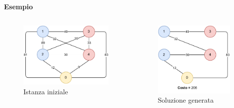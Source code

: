 \documentclass[9pt]{beamer}
\begin{document}
\begin{frame}[allowframebreaks]{\subsecname}
\textbf{Esempio}
\begin{columns}[T,onlytextwidth]
	\begin{figure}[h]
	\centering
	\includegraphics[height=0.4\textheight]
	{../images/graph-tsppd-with-two-customers}	
	\caption{Istanza iniziale}
	\end{figure}
	\begin{figure}[h]
	\centering
	\includegraphics[height=0.4\textheight]
	{../images/graph-greedy-nearest-neighbor-solution-tsppd-with-two-customers}	
	\caption{Soluzione generata}
	\end{figure}
\end{columns}

\framebreak


\end{frame}
\end{document}
